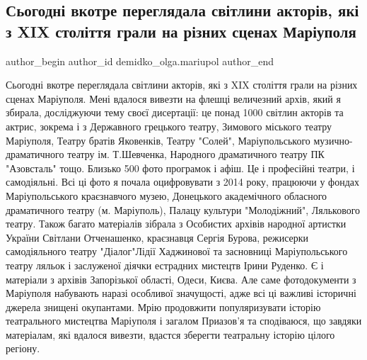  
 
 
 
 

\subsection{Сьогодні вкотре переглядала світлини акторів, які з XIX століття грали на різних сценах Маріуполя}
\label{sec:26_01_2023.fb.demidko_olga.mariupol.1.foto_aktory_teatr_xix_stolittja}

\ifcmt
 author_begin
   author_id demidko_olga.mariupol
 author_end
\fi


Сьогодні вкотре переглядала світлини акторів, які з XIX століття грали на
різних сценах Маріуполя. Мені вдалося вивезти на флешці величезний архів, який
я збирала, досліджуючи тему своєї дисертації: це понад 1000 світлин акторів та
актрис, зокрема і з Державного грецького театру, Зимового міського театру
Маріуполя, Театру братів Яковенків, Театру "Солей",  Маріупольського
музично-драматичного театру ім. Т.Шевченка,  Народного драматичного театру ПК
"Азовсталь" тощо.  Близько 500 фото програмок і афіш. Це і професійні театри, і
самодіяльні. Всі ці фото я почала оцифровувати з 2014 року, працюючи у фондах
Маріупольського краєзнавчого музею, Донецького академічного обласного
драматичного театру (м. Маріуполь), Палацу культури "Молодіжний", Лялькового
театру. Також багато матеріалів зібрала з  Особистих архівів народної артистки
України Світлани Отченашенко, краєзнавця Сергія Бурова, режисерки самодіяльного
театру "Діалог"Лідії Хаджинової та засновниці Маріупольського театру ляльок і
заслуженої діячки естрадних мистецтв Ірини Руденко. Є і матеріали з архівів
Запорізької області, Одеси, Києва. Але саме фотодокументи з Маріуполя набувають
наразі особливої значущості, адже всі ці важливі історичні джерела знищені
окупантами. Мрію продовжити популяризувати історію театрального мистецтва
Маріуполя і загалом Приазов'я та сподіваюся, що завдяки матеріалам, які вдалося
вивезти, вдастся зберегти театральну історію цілого регіону.

